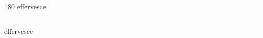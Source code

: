 
\begin{frame}
\begin{center}
\begin{turn}{180}
{\fontsize{2.5cm}{1em}\selectfont effervesce}
\end{turn}
\vspace{1em}\par  
\hrule
\vspace{1em}\par  
{\fontsize{2.5cm}{1em}\selectfont effervesce}
\end{center}
\end{frame}
